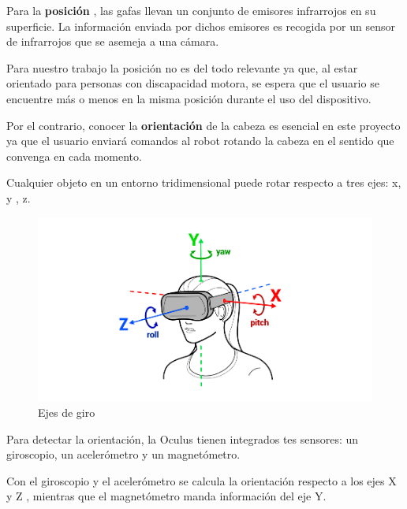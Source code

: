 \documentclass[twoside, 12pt]{epstfg}
\begin{document}
Para la \textbf{posición} , las gafas llevan un conjunto de emisores infrarrojos en su superficie. La información enviada por dichos emisores es recogida por un sensor de infrarrojos que se asemeja a una cámara.

Para nuestro trabajo la posición no es del todo relevante ya que, al estar orientado para personas con discapacidad motora,  se espera que el usuario se encuentre más o menos en la misma posición durante el uso del dispositivo.

Por el contrario, conocer la \textbf{orientación} de la cabeza es esencial en este proyecto ya que el usuario enviará comandos al robot rotando la cabeza en el sentido que convenga en cada momento.

Cualquier objeto en un entorno tridimensional puede rotar respecto a  tres ejes: x, y , z.

\begin{figure}[H]
	\centerline{
		\mbox{\includegraphics[width=5.00in]{images/headTrack.png}}
	}
	\caption{Ejes de giro}
\end{figure}

Para detectar la orientación, la Oculus tienen integrados tes sensores: un giroscopio, un acelerómetro y un magnetómetro.

Con el giroscopio y el acelerómetro se calcula la orientación respecto a los ejes  X y Z , mientras que el magnetómetro manda información del eje Y.
\end{document}
